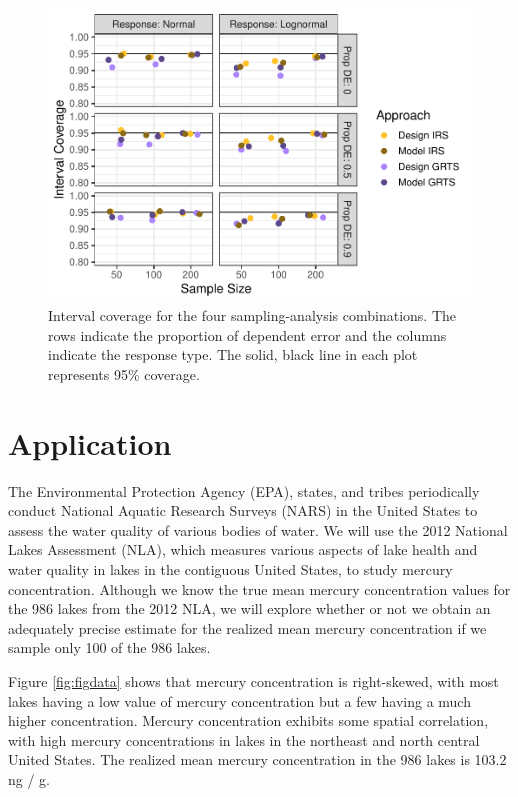 \documentclass[]{elsarticle} %
\begin{document}
\begin{figure}
\includegraphics[width=1\linewidth]{manuscript_files/figure-latex/figconf-1} \caption{Interval coverage for the four sampling-analysis combinations. The rows indicate the proportion of dependent error and the columns indicate the response type. The solid, black line in each plot represents 95\% coverage.}\label{fig:figconf}
\end{figure}

\hypertarget{application}{%
\section{Application}\label{application}}

The Environmental Protection Agency (EPA), states, and tribes
periodically conduct National Aquatic Research Surveys (NARS) in the
United States to assess the water quality of various bodies of water. We
will use the 2012 National Lakes Assessment (NLA), which measures
various aspects of lake health and water quality in lakes in the
contiguous United States, to study mercury concentration. Although we
know the true mean mercury concentration values for the 986 lakes from
the 2012 NLA, we will explore whether or not we obtain an adequately
precise estimate for the realized mean mercury concentration if we
sample only 100 of the 986 lakes.

Figure \ref{fig:figdata} shows that mercury concentration is
right-skewed, with most lakes having a low value of mercury
concentration but a few having a much higher concentration. Mercury
concentration exhibits some spatial correlation, with high mercury
concentrations in lakes in the northeast and north central United
States. The realized mean mercury concentration in the 986 lakes is
103.2 ng / g.
\end{document}
